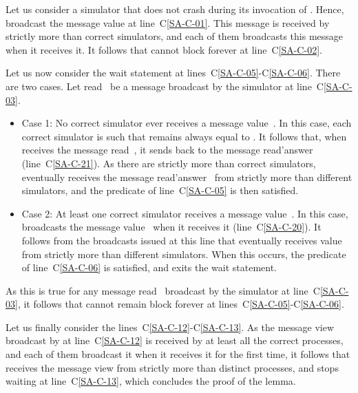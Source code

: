 \documentclass[11pt,letterpaper]{article}
\newlength {\afterproof}
\newcommand{\toto}{xxx}
\newenvironment{proofL}{\noindent{\bf Proof }}
{\hspace*{\fill}\par\vspace{\afterproof}}
\begin{document}
\begin{proofL}
Let us consider a simulator  that does not crash during its invocation of
  .
Hence,  broadcast the message {\sc value} 
at line~C\ref{SA-C-01}.
This message is received by strictly more than  correct 
simulators, and each
of them  broadcasts this message when it receives it. It follows that
 cannot block forever at line~C\ref{SA-C-02}.

Let us now consider the wait statement at lines~C\ref{SA-C-05}-C\ref{SA-C-06}.
There are two cases. Let  {\sc read}~ be a message
broadcast by  the simulator  at line~C\ref{SA-C-03}.
\begin{itemize}
\vspace{-0.2cm}
\item Case 1:
No correct simulator ever receives a message {\sc value}~.
In this case, each correct simulator   is such that
 remains always equal to .
It follows  that, when   receives the  message {\sc  read}~,
it sends back to  the message {\sc read'answer}~
(line~C\ref{SA-C-21}).
As there are strictly more than  correct simulators, 
 eventually receives the   message  {\sc read'answer}~ 
from strictly  more than 
different  simulators, and the predicate of line~C\ref{SA-C-05}
is then satisfied.
\vspace{-0.2cm}
\item Case 2:
At least one correct simulator  receives a message {\sc value}~.
In  this case,    broadcasts  the message  {\sc  value}~ when  it
receives it (line~C\ref{SA-C-20}).
It follows from the broadcasts issued at this line  that  eventually
receives {\sc value}~ from strictly more than  different 
simulators.
When this occurs, the predicate of line~C\ref{SA-C-06} is satisfied,
and  exits the wait statement.
\end{itemize}
As this is true for any message  {\sc read}~ broadcast by
the simulator  at line~C\ref{SA-C-03}, it follows that  cannot
remain block forever at lines~C\ref{SA-C-05}-C\ref{SA-C-06}.



Let us finally consider  the lines~C\ref{SA-C-12}-C\ref{SA-C-13}.
As the message  {\sc view}   broadcast by 
at line~C\ref{SA-C-12} is received by at least all the correct processes,
and  each of them broadcast it when it receives it for the first time,
it follows that  receives the message  {\sc view}  from
strictly more than  distinct processes, and stops waiting at 
line~C\ref{SA-C-13},
which concludes the proof of the lemma.
\renewcommand{\toto}{lemma:safe-agr-term-propose}
\end{proofL}
\end{document}
